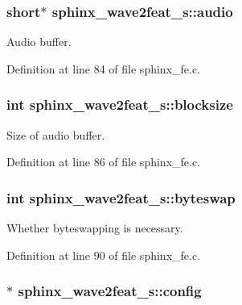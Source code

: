 \subsubsection[{audio}]{\setlength{\rightskip}{0pt plus 5cm}short$\ast$ sphinx\-\_\-wave2feat\-\_\-s\-::audio}\label{structsphinx__wave2feat__s_a776c72734abe1e34162a5ee347f533e5}


Audio buffer. 



Definition at line 84 of file sphinx\-\_\-fe.\-c.

\subsubsection[{blocksize}]{\setlength{\rightskip}{0pt plus 5cm}int sphinx\-\_\-wave2feat\-\_\-s\-::blocksize}\label{structsphinx__wave2feat__s_aff2646e41780ceb9dcd234c719fd25f1}


Size of audio buffer. 



Definition at line 86 of file sphinx\-\_\-fe.\-c.

\subsubsection[{byteswap}]{\setlength{\rightskip}{0pt plus 5cm}int sphinx\-\_\-wave2feat\-\_\-s\-::byteswap}\label{structsphinx__wave2feat__s_a030717e2736fd04d1a281f51e5db2799}


Whether byteswapping is necessary. 



Definition at line 90 of file sphinx\-\_\-fe.\-c.

\subsubsection[{config}]{$\ast$ sphinx\-\_\-wave2feat\-\_\-s\-::config}\label{structsphinx__wave2feat__s_a484d308befbde315664da8520ebc410d}


